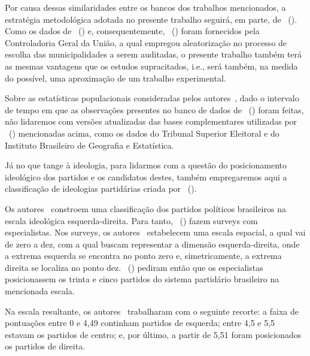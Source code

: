 \documentclass[
	12pt,				%
	openright,			%
	twoside,			%
	a4paper,			%
	openany,
	english,			%
	brazil				%
	]{abntex2}
\begin{document}
Por causa dessas similaridades entre os bancos dos trabalhos mencionados, a estratégia metodológica adotada no presente trabalho seguirá, em parte, de ~(\citeyear{ferraz2008exposing}). Como os dados de ~(\citeyear{ferraz2008exposing}) e, consequentemente, ~(\citeyear{Brollo2013Aug}) foram fornecidos pela Controladoria Geral da União, a qual empregou aleatorização no processo de escolha das municipalidades a serem auditadas, o presente trabalho também terá as mesmas vantagens que os estudos supracitados, i.e., será também, na medida do possível, uma aproximação de um trabalho experimental.

Sobre as estatísticas populacionais consideradas pelos autores~\cite{Brollo2013Aug, ferraz2008exposing}, dado o intervalo de tempo em que as observações presentes no banco de dados de ~(\citeyear{Brollo2013Aug}) foram feitas, não lidaremos com versões atualizadas das bases complementares utilizadas por ~(\citeyear{ferraz2008exposing}) mencionadas acima, como os dados do Tribunal Superior Eleitoral e do Instituto Brasileiro de Geografia e Estatística.

Já no que tange à ideologia, para lidarmos com a questão do posicionamento ideológico dos partidos e os candidatos destes, também empregaremos aqui a classificação de ideologias partidárias criada por ~(\citeyear{Bolognesi2022Sep}).

Os autores~\cite{Bolognesi2022Sep} constroem uma classificação dos partidos políticos brasileiros na escala ideológica esquerda-direita. Para tanto, ~(\citeyear{Bolognesi2022Sep}) fazem surveys com especialistas. Nos surveys, os autores~\cite{Bolognesi2022Sep} estabelecem uma escala espacial, a qual vai de zero a dez, com a qual buscam representar a dimensão esquerda-direita, onde a extrema esquerda se encontra no ponto zero e, simetricamente, a extrema direita se localiza no ponto dez. ~(\citeyear{Bolognesi2022Sep}) pediram então que os especialistas posicionassem os trinta e cinco partidos do sistema partidário brasileiro na mencionada escala.

Na escala resultante, os autores~\cite{Bolognesi2022Sep} trabalharam com o seguinte recorte: a faixa de pontuações entre 0 e 4,49 continham partidos de esquerda; entre 4,5 e 5,5 estavam os partidos de centro; e, por último, a partir de 5,51 foram posicionados os partidos de direita.
\end{document}
